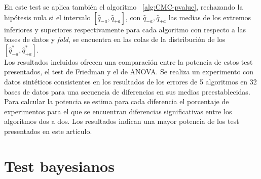 	En este test se aplica también el algoritmo ~\ref{alg:CMC-pvalue}, rechazando la hipótesis nula si el intervalo $[\hat{q}_{-a}, \hat{q}_{+a}]$, con $\hat{q}_{-a}, \hat{q}_{+a}$ las medias de los extremos inferiores y superiores respectivamente para cada algoritmo con respecto a las bases de datos y \textit{fold}, se encuentra en las colas de la distribución de los $[\hat{q}_{-a}^*, \hat{q}_{+a}^*]$.\\
	Los resultados incluidos ofrecen una comparación entre la potencia de estos test presentados, el test de Friedman y el de ANOVA. Se realiza un experimento con datos sintéticos consistentes en los resultados de los errores de 5 algoritmos en 32 bases de datos para una secuencia de diferencias en sus medias preestablecidas. Para calcular la potencia se estima para cada diferencia el porcentaje de experimentos para el que se encuentran diferencias significativas entre los algoritmos dos a dos. Los resultados indican una mayor potencia de los test presentados en este artículo.


\section{Test bayesianos}	
